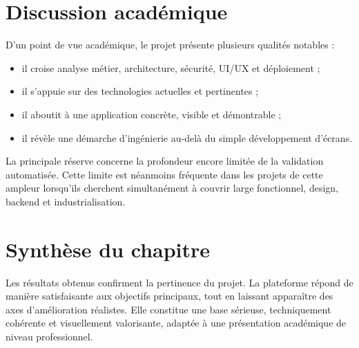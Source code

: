 \section{Discussion académique}
D'un point de vue académique, le projet présente plusieurs qualités notables :
\begin{itemize}
  \item il croise analyse métier, architecture, sécurité, UI/UX et déploiement ;
  \item il s'appuie sur des technologies actuelles et pertinentes ;
  \item il aboutit à une application concrète, visible et démontrable ;
  \item il révèle une démarche d'ingénierie au-delà du simple développement d'écrans.
\end{itemize}

La principale réserve concerne la profondeur encore limitée de la validation automatisée. Cette limite est néanmoins fréquente dans les projets de cette ampleur lorsqu'ils cherchent simultanément à couvrir large fonctionnel, design, backend et industrialisation.

\section{Synthèse du chapitre}
Les résultats obtenus confirment la pertinence du projet. La plateforme répond de manière satisfaisante aux objectifs principaux, tout en laissant apparaître des axes d'amélioration réalistes. Elle constitue une base sérieuse, techniquement cohérente et visuellement valorisante, adaptée à une présentation académique de niveau professionnel.









